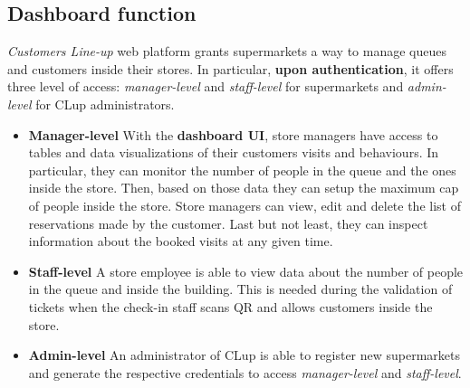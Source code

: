 \subsection{Dashboard function}
\textit{Customers Line-up} web platform grants supermarkets a way to manage queues and customers inside their stores. In particular, \textbf{upon authentication}, it offers three level of access: \textit{manager-level} and \textit{staff-level} for supermarkets and \textit{admin-level} for CLup administrators.

\begin{itemize}
	\item \textbf{Manager-level}\newline
	With the \textbf{dashboard UI}, store managers have access to tables and data visualizations of their customers visits and behaviours. In particular, they can monitor the number of people in the queue and the ones inside the store. Then, based on those data they can setup the maximum cap of people inside the store.\newline
	Store managers can view, edit and delete the list of reservations made by the customer.\newline
	Last but not least, they can inspect information about the booked visits at any given time.

	\item \textbf{Staff-level}\newline
	A store employee is able to view data about the number of people in the queue and inside the building. This is needed during the validation of tickets when the check-in staff scans QR and allows customers inside the store.

    \item \textbf{Admin-level}\newline
    An administrator of CLup is able to register new supermarkets and generate the respective credentials to access \textit{manager-level} and \textit{staff-level}.
\end{itemize}


